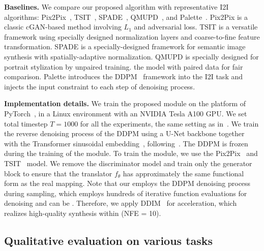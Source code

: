 \noindent\textbf{Baselines.}
%
We compare our proposed \method algorithm with  representative I2I algorithms:  Pix2Pix~\cite{isola2017image}, TSIT~\cite{jiang2020tsit}, SPADE~\cite{park2019SPADE}, QMUPD~\cite{YiLLR22}, and Palette~\cite{saharia2021palette}.
%
%
Pix2Pix is a classic cGAN-based method involving $L_1$ and adversarial loss.
%
TSIT is a  versatile framework using specially designed normalization layers and coarse-to-fine feature transformation.
%
SPADE is a  specially-designed framework for semantic image synthesis with spatially-adaptive normalization.
%
QMUPD  is specially designed for portrait stylization by unpaired training.  the model with paired data for fair comparison.
%
Palette introduces the DDPM~\cite{ho2020denoising} framework into the I2I task and injects the input constraint to each step of  denoising process.

\noindent\textbf{Implementation details.}
%
We train the proposed \method module on the platform of PyTorch~\cite{paszke2019pytorch}, in a Linux environment with an NVIDIA Tesla A100 GPU.
%
We set total timestep $T=1000$ for all the experiments, the same setting as in~\cite{ho2020denoising}.
%
We train the reverse denoising process of the DDPM using a U-Net backbone together with the Transformer sinusoidal embedding~\cite{ronneberger2015u,vaswani2017attention}, following~\cite{dhariwal2021diffusion}.
%
The DDPM is frozen during the training of the \method module.
%
To train the \method module, we use the Pix2Pix~\cite{isola2017image} and TSIT~\cite{jiang2020tsit} model.  We remove the discriminator model and train only the generator block to ensure that the translator $f_{\theta}$ has approximately the same functional form as the real mapping.
%
Note that our \method employs the DDPM denoising process during sampling, which employs hundreds of iterative function evaluations for denoising and can be .
%
Therefore, we apply DDIM~\cite{song2020denoising} for acceleration, which realizes high-quality synthesis within  (NFE = 10).


\setlength{\tabcolsep}{5pt}




\subsection{Qualitative evaluation on various tasks}\label{subsec:Quality}

